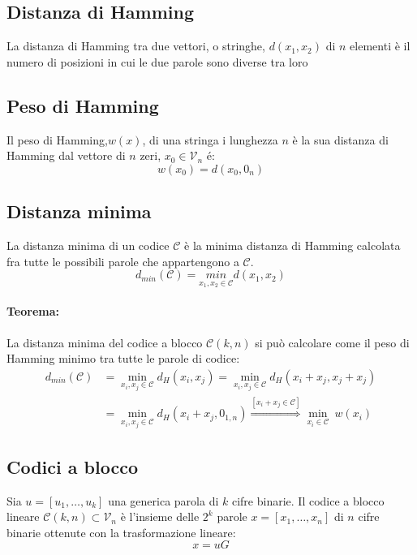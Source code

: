     \subsection{Distanza di Hamming}
        La distanza di Hamming tra due vettori, o stringhe, $d(x_1,x_2)$ di $n$ elementi è il numero di posizioni in cui le due parole
        sono diverse tra loro
    \subsection{Peso di Hamming}
        Il peso di Hamming,$w(x)$, di una stringa i lunghezza $n$ è la sua distanza di Hamming dal vettore di $n$ zeri,
        $x_0\in \mathcal{V}_n$ é:
        \[
            w(x_0) = d(x_0,0_n)
        \]
    \subsection{Distanza minima}    
        La distanza minima di un codice $\mathcal{C}$ è la minima distanza di Hamming calcolata fra tutte le possibili parole che appartengono a $\mathcal{C}$.
        \[
            d_{min} (\mathcal{C})= \underset{x_1,x_2 \in \mathcal{C}}{min}d(x_1,x_2)  
        \]
        \paragraph{Teorema:} La distanza minima del codice a blocco $\mathcal{C}(k,n)$ si può calcolare come il 
            peso di Hamming minimo tra tutte le parole di codice:
            \begin{align}
                d_{min}(\mathcal{C}) &= \underset{x_i,x_j\in\mathcal{C}}{\min} d_H(x_i,x_j) = \underset{x_i,x_j\in\mathcal{C}}{\min} d_H(x_i+x_j,x_j+x_j)\nonumber \\
                                        &= \underset{x_i,x_j\in\mathcal{C}}{\min} d_H(x_i+x_j,0_{1,n}) \overset{[x_i+x_j\in\mathcal{C}]}{\Rightarrow} \underset{x_i\in\mathcal{C}}{\min}\ w(x_i)\nonumber
            \end{align}
    \subsection{Codici a blocco}
        Sia $u = [u_1, \dots, u_k]$ una generica parola di $k$ cifre binarie. Il codice a blocco lineare $\mathcal{C}(k,n)\subset \mathcal{V}_n$ è l'insieme delle
        $2^k$ parole $x = [x_1, \dots, x_n]$ di $n$ cifre binarie ottenute con la trasformazione lineare:
        \[
            x = uG  
        \]
